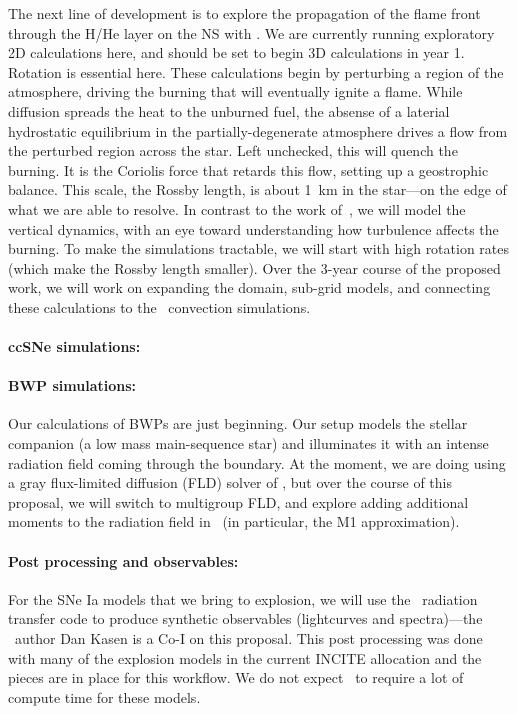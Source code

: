 The next line of development is to explore the propagation of the
flame front through the H/He layer on the NS with \castro.  We are
currently running exploratory 2D calculations here, and should be set
to begin 3D calculations in year 1.  Rotation is essential here.
These calculations begin by perturbing a region of the atmosphere,
driving the burning that will eventually ignite a flame.  While
diffusion spreads the heat to the unburned fuel, the absense of a
laterial hydrostatic equilibrium in the partially-degenerate
atmosphere drives a flow from the perturbed region across the star.
Left unchecked, this will quench the burning.  It is the Coriolis
force that retards this flow, setting up a geostrophic balance.  This
scale, the Rossby length, is about 1~km in the star---on the edge of
what we are able to resolve.  In contrast to the work
of~\cite{cavecchi:2013}, we will model the vertical dynamics, with an
eye toward understanding how turbulence affects the burning.  To make
the simulations tractable, we will start with high rotation rates
(which make the Rossby length smaller).  Over the 3-year course of the
proposed work, we will work on expanding the domain, sub-grid models,
and connecting these calculations to the \maestro\ convection
simulations.


\paragraph{ccSNe simulations: } 


\paragraph{BWP simulations: }  Our calculations of BWPs are just beginning.
Our setup models the stellar companion (a low mass main-sequence star)
and illuminates it with an intense radiation field coming through the
boundary.  At the moment, we are doing using a gray flux-limited
diffusion (FLD) solver of \castro, but over the course of this
proposal, we will switch to multigroup FLD, and explore adding
additional moments to the radiation field in \castro\ (in particular,
the M1 approximation).  


\paragraph{Post processing and observables: }
%
For the SNe Ia models that we bring to explosion, we will use the 
\sedona\ radiation transfer code to produce synthetic observables
(lightcurves and spectra)---the \sedona\ author Dan Kasen is a Co-I on
this proposal.  This post processing was done with many of the explosion 
models in the current INCITE allocation and the pieces are in place for this
workflow. We do not expect \sedona\ to require a lot of compute
time for these models.


